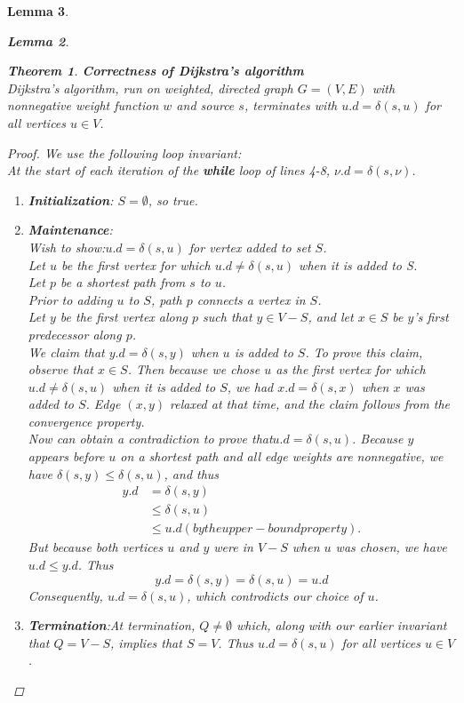 \documentclass[a4paper,11pt]{book}
\newtheorem{theorem}{Theorem}[chapter]
\newtheorem{lemma}[theorem]{Lemma}
\begin{document}
{\begin{lemma}
\begin{lemma}
\begin{theorem}\textbf{Correctness of Dijkstra's algorithm}\\
Dijkstra's algorithm, run on weighted, directed graph $G = (V, E)$ with nonnegative weight function $w$ and source $s$, terminates with $u.d = \delta(s, u)$ for all vertices $u \in V$.
\end{theorem}
\begin{proof}
We use the following loop invariant:\\
At the start of each iteration of the \textbf{while} loop of lines 4-8, $\nu.d = \delta(s,\nu)$.\\
\begin{enumerate}
\item \textbf{Initialization}: $S=\emptyset$, so true.
\item \textbf{Maintenance}:\\Wish to show:$u.d=\delta(s,u)$ for vertex added to set $S$.\\Let $u$ be the first vertex for which $u.d\neq \delta(s,u)$ when it is added to S.\\Let $p$ be a shortest path from $s$ to $u$.\\Prior to adding $u$ to $S$, path $p$ connects a vertex in $S$.\\Let $y$ be the first vertex along $p$ such that $y\in V-S$, and let $x\in S$ be $y$'s first predecessor along $p$. \\We claim that $y.d = \delta(s,y)$ when $u$ is added to $S$. To prove this claim, observe that $x\in S$. Then because we chose $u$ as the first vertex for which $u.d \neq \delta(s,u)$ when it is added to $S$, we had $x.d = \delta(s,x)$ when $x$ was added to $S$. Edge $(x,y)$ relaxed at that time, and the claim follows from the convergence property.\\Now can obtain a contradiction to prove that$u.d = \delta(s,u)$. Because $y$ appears before $u$ on a shortest path and all edge weights are nonnegative, we have $\delta(s, y) \leq \delta(s,u)$, and thus
\begin{equation}
\begin{split}
y.d & = \delta(s,y)\\&\leq \delta(s,u)\\&\leq u.d   (by the upper-bound property).
\end{split}
\end{equation}
But because both vertices $u$ and $y$ were in $V-S$ when $u$ was chosen, we have $u.d\leq y.d$. Thus
\[y.d=\delta(s,y)=\delta(s,u)=u.d\]
Consequently, $u.d = \delta(s,u)$, which controdicts our choice of $u$.
\item \textbf{Termination}:At termination, $Q\neq \emptyset$ which, along with our earlier invariant that $Q=V-S$, implies that $S=V$. Thus $u.d=\delta(s,u)$ for all vertices $u\in V$.
\end{enumerate}
\end{proof}

\end{lemma}
\end{lemma}}
\end{document}
